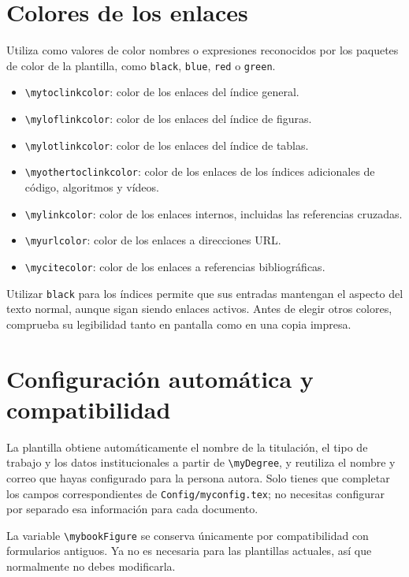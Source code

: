 \section{Colores de los enlaces}

Utiliza como valores de color nombres o expresiones reconocidos por los paquetes de color de la plantilla, como \texttt{black}, \texttt{blue}, \texttt{red} o \texttt{green}.

\begin{itemize}
  \item \texttt{\textbackslash{}mytoclinkcolor}: color de los enlaces del índice general.
  \item \texttt{\textbackslash{}myloflinkcolor}: color de los enlaces del índice de figuras.
  \item \texttt{\textbackslash{}mylotlinkcolor}: color de los enlaces del índice de tablas.
  \item \texttt{\textbackslash{}myothertoclinkcolor}: color de los enlaces de los índices adicionales de código, algoritmos y vídeos.
  \item \texttt{\textbackslash{}mylinkcolor}: color de los enlaces internos, incluidas las referencias cruzadas.
  \item \texttt{\textbackslash{}myurlcolor}: color de los enlaces a direcciones URL.
  \item \texttt{\textbackslash{}mycitecolor}: color de los enlaces a referencias bibliográficas.
\end{itemize}

Utilizar \texttt{black} para los índices permite que sus entradas mantengan el aspecto del texto normal, aunque sigan siendo enlaces activos. Antes de elegir otros colores, comprueba su legibilidad tanto en pantalla como en una copia impresa.

\section{Configuración automática y compatibilidad}

La plantilla obtiene automáticamente el nombre de la titulación, el tipo de trabajo y los datos institucionales a partir de \texttt{\textbackslash{}myDegree}, y reutiliza el nombre y correo que hayas configurado para la persona autora. Solo tienes que completar los campos correspondientes de \texttt{Config/myconfig.tex}; no necesitas configurar por separado esa información para cada documento.

La variable \texttt{\textbackslash{}mybookFigure} se conserva únicamente por compatibilidad con formularios antiguos. Ya no es necesaria para las plantillas actuales, así que normalmente no debes modificarla.

